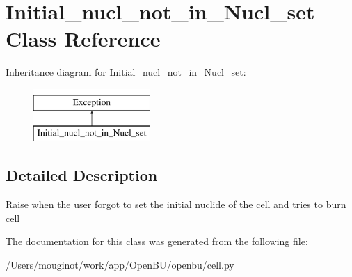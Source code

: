 \hypertarget{classopenbu_1_1cell_1_1_initial__nucl__not__in___nucl__set}{}\section{Initial\+\_\+nucl\+\_\+not\+\_\+in\+\_\+\+Nucl\+\_\+set Class Reference}
\label{classopenbu_1_1cell_1_1_initial__nucl__not__in___nucl__set}
Inheritance diagram for Initial\+\_\+nucl\+\_\+not\+\_\+in\+\_\+\+Nucl\+\_\+set\+:\begin{figure}[H]
\begin{center}
\leavevmode
\includegraphics[height=2.000000cm]{classopenbu_1_1cell_1_1_initial__nucl__not__in___nucl__set}
\end{center}
\end{figure}


\subsection{Detailed Description}
\begin{DoxyVerb}Raise when the user forgot to set the initial nuclide of the cell and tries to burn cell\end{DoxyVerb}
 

The documentation for this class was generated from the following file\+:\begin{DoxyCompactItemize}
\item 
/\+Users/mouginot/work/app/\+Open\+B\+U/openbu/cell.\+py\end{DoxyCompactItemize}
